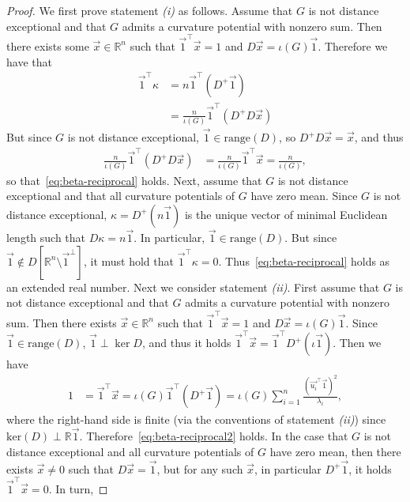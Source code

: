 \documentclass[11pt,a4paper]{article}
\newcommand{\distmatrix}{D}
\newcommand{\x}{\vec{x}}
\newcommand{\one}{\vec{1}}
\begin{document}
    \begin{proof}
        We first prove statement \emph{(i)} as follows. Assume that $G$ is not distance exceptional and that $G$ admits a curvature potential with nonzero sum. Then there exists some $\x\in\mathbb{R}^{n}$ such that $\one^\top\x = 1$ and $\distmatrix\x = \iota(G)\one$. Therefore we have that
            \begin{align*}
                \one^\top\kappa &= n\one^\top (\distmatrix^+ \one) \\
                &= \frac{n}{\iota(G)}\one^\top (\distmatrix^+\distmatrix \x)
            \end{align*}
        But since $G$ is not distance exceptional, $\one\in\mathrm{range}(\distmatrix)$, so $\distmatrix^+\distmatrix\x =\x$, and thus
            \begin{align*}
                \frac{n}{\iota(G)}\one^\top (\distmatrix^+\distmatrix \x) &= \frac{n}{\iota(G)}\one^\top \x = \frac{n}{\iota(G)},
            \end{align*}
        so that~\cref{eq:beta-reciprocal} holds. Next, assume that $G$ is not distance exceptional and that all curvature potentials of $G$ have zero mean. Since $G$ is not distance exceptional, $\kappa = \distmatrix^+(n\one)$ is the unique vector of minimal Euclidean length such that $\distmatrix\kappa = n\one$. In particular, $\one\in\mathrm{range}(\distmatrix)$. But since $\one\notin D[\mathbb{R}^{n}\setminus\one^\perp]$, it must hold that $\one^\top\kappa = 0$. Thus~\cref{eq:beta-reciprocal} holds as an extended real number. Next we consider statement \emph{(ii)}. First assume that $G$ is not distance exceptional and that $G$ admits a curvature potential with nonzero sum. Then there exists $\x\in\mathbb{R}^{n}$ such that $\one^\top\x = 1$ and $\distmatrix\x = \iota(G)\one$. Since $\one\in\mathrm{range}(\distmatrix)$, $\one\perp\ker\distmatrix$, and thus it holds $\one^\top \x = \one^\top \distmatrix^+(\iota\one)$. Then we have
            \begin{align*}
                1 &= \one^\top\x = \iota(G)\one^\top (\distmatrix^+\one) = \iota(G) \sum_{i=1}^{n} \frac{(\vec{u_i}^\top \one)^2}{\lambda_i},
            \end{align*}
        where the right-hand side is finite (via the conventions of statement \emph{(ii)}) since $\mathrm{ker}(\distmatrix)\perp\mathbb{R}\one$. Therefore~\cref{eq:beta-reciprocal2} holds. In the case that $G$ is not distance exceptional and all curvature potentials of $G$ have zero mean, then there exists $\x\neq 0 $ such that $\distmatrix\x = \one$, but for any such $\x$, in particular $\distmatrix^+\one$, it holds $\one^\top\x = 0$. In turn,

\end{proof}
\end{document}
